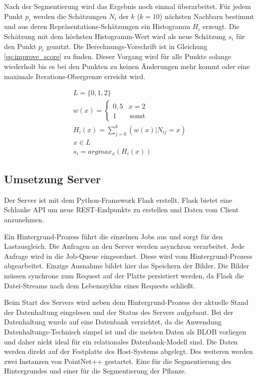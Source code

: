 \documentclass[12pt,titlepage, twoside]{article}
\begin{document}
Nach der Segmentierung wird das Ergebnis noch einmal überarbeitet. Für jedem Punkt $p_i$ werden die Schätzungen $N_i$ der $k$ ($k=10$) nächsten Nachbarn bestimmt und aus deren Repräsentations-Schätzungen ein Histogramm $H_i$ erzeugt.
Die Schätzung mit dem höchsten Histogramm-Wert wird als neue Schätzung $s_i$ für den Punkt $p_i$ genutzt. Die Berechnungs-Vorschrift ist in Gleichung \ref{eq:improve_score} zu finden. 
Dieser Vorgang wird für alle Punkte solange wiederholt bis es bei den Punkten zu keinen Änderungen mehr kommt oder eine maximale Iterations-Obergrenze erreicht wird.

\begin{equation}
\label{eq:improve_score}
\begin{array}{l}
L =  \{0,1,2\}\\
w(x) = \left\{
\begin{array}{ll}
0,5 & x = 2 \\
1 & \, \textrm{sonst} 
\end{array}
\right.\\ 
H_i(x) = \sum_{j=0}^{k}{(w(x) | N_{ij} = x)}\\
x \in L\\
s_i = argmax_x(H_i(x))
\end{array}
\end{equation}

\subsection{Umsetzung Server}
\label{sec:realisierung:implementierung4}

Der Server ist mit dem Python-Framework Flask erstellt. Flask bietet eine Schlanke API um neue REST-Endpunkte zu erstellen und Daten vom Client anzunehmen. 

Ein Hintergrund-Prozess führt die einzelnen Jobs aus und sorgt für den Lastausgleich. Die Anfragen an den Server werden asynchron verarbeitet. 
Jede Anfrage wird in die Job-Queue eingeordnet. Diese wird vom Hintergrund-Prozess abgearbeitet.
Einzige Ausnahme bildet hier das Speichern der Bilder. Die Bilder müssen synchrone zum Request auf der Platte persistiert werden, da Flask die Datei-Streams nach dem Lebenszyklus eines Requests schließt.

Beim Start des Servers wird neben dem Hintergrund-Prozess der aktuelle Stand der Datenhaltung eingelesen und der Status des Servers aufgebaut. 
Bei der Datenhaltung wurde auf eine Datenbank verzichtet, da die Anwendung Datenhaltungs-Technisch simpel ist und die meisten Daten als BLOB \cite{sears2007blob} vorliegen und daher nicht ideal für ein relationales Datenbank-Modell sind. 
Die Daten werden direkt auf der Festplatte des Host-Systems abgelegt.
Des weiteren werden zwei Instanzen von PointNet++ gestartet. Eine für die Segmentierung des Hintergrundes und einer für die Segmentierung der Pflanze.
\end{document}
